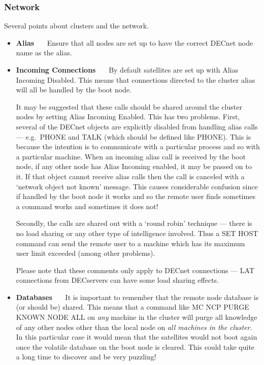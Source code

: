 \subsubsection {Network}

Several points about clusters and the network.

\begin {itemize}
\item {\bf Alias} 
~~~Ensure that all nodes are set up to have the correct DECnet node
name as the alias.

\item {\bf Incoming Connections}
~~~By default satellites are set up with Alias Incoming Disabled.
This means that connections directed to the cluster alias will all be handled
by the boot node.

It may be suggested that these calls should be shared around the cluster nodes
by setting Alias Incoming Enabled.
This has two problems.
First, several of the DECnet objects are explicitly disabled from handling
alias calls --- e.g.\ PHONE and TALK (which should be defined like PHONE).
This is because the intention is to communicate with a particular process and
so with a particular machine.
When an incoming alias call is received by the boot node, if any other node has
Alias Incoming enabled, it may be passed on to it.
If that object cannot receive alias calls then the call is canceled with a
`network object not known' message.
This causes considerable confusion since if handled by the boot node it works
and so the remote user finds sometimes a command works and sometimes it does
not!

Secondly, the calls are shared out with a `round robin' technique --- there is
no load sharing or any other type of intelligence involved.
Thus a SET HOST command can send the remote user to a machine which has its
maximum user limit exceeded (among other problems).

Please note that these comments only apply to DECnet connections --- LAT
connections from DECservers can have some load sharing effects.

\item {\bf Databases}
~~~It is important to remember that the remote node database is (or should be)
shared.
This means that a command like MC NCP PURGE KNOWN NODE ALL on {\em any} machine
in the cluster will purge all knowledge of any other nodes other than the
local node on {\em all machines in the cluster}. 
In this particular case it would mean that the satellites would not boot again
once the volatile database on the boot node is cleared.
This could take quite a long time to discover and be very puzzling!


\end{itemize}
